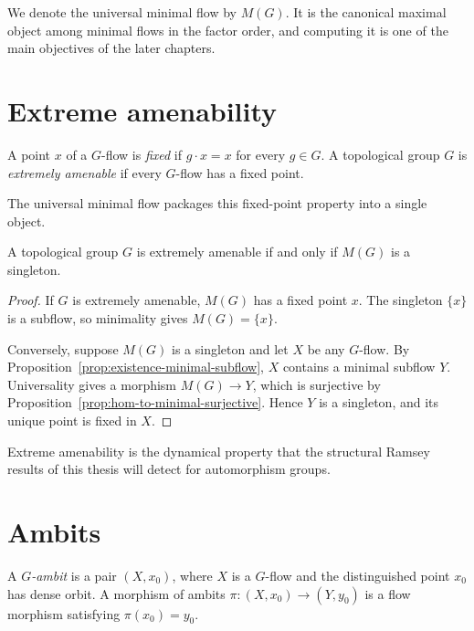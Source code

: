 We denote the universal minimal flow by \(M(G)\).  It is the canonical maximal
object among minimal flows in the factor order, and computing it is one of the
main objectives of the later chapters.

\section{Extreme amenability}

\begin{definition}
    A point \(x\) of a \(G\)-flow is \emph{fixed} if \(g\cdot x=x\) for every
    \(g\in G\).  A topological group \(G\) is \emph{extremely amenable} if every
    \(G\)-flow has a fixed point.
\end{definition}

The universal minimal flow packages this fixed-point property into a single
object.

\begin{proposition}
    \label{prop:extreme-amenable-iff-umf-singleton}
    A topological group \(G\) is extremely amenable if and only if \(M(G)\) is
    a singleton.
\end{proposition}

\begin{proof}
    If \(G\) is extremely amenable, \(M(G)\) has a fixed point \(x\).  The
    singleton \(\{x\}\) is a subflow, so minimality gives \(M(G)=\{x\}\).

    Conversely, suppose \(M(G)\) is a singleton and let \(X\) be any
    \(G\)-flow.  By Proposition~\ref{prop:existence-minimal-subflow}, \(X\)
    contains a minimal subflow \(Y\).  Universality gives a morphism
    \(M(G)\to Y\), which is surjective by
    Proposition~\ref{prop:hom-to-minimal-surjective}.  Hence \(Y\) is a
    singleton, and its unique point is fixed in \(X\).
\end{proof}

Extreme amenability is the dynamical property that the structural Ramsey
results of this thesis will detect for automorphism groups.

\section{Ambits}

\begin{definition}
    A \emph{\(G\)-ambit} is a pair \((X,x_0)\), where \(X\) is a \(G\)-flow and
    the distinguished point \(x_0\) has dense orbit.  A morphism of ambits
    \(\pi\colon(X,x_0)\to(Y,y_0)\) is a flow morphism satisfying
    \(\pi(x_0)=y_0\).
\end{definition}

